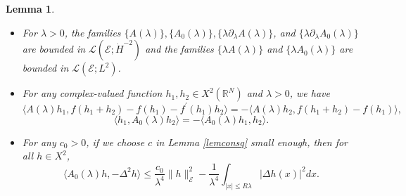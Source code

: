 \documentclass[a4paper,two-side,10pt]{amsart}
\newtheorem{lem}{Lemma}[section]
\newcommand{\R}{\mathbb{R}}
\numberwithin{equation}{section}
\begin{document}
\begin{lem}
\label{lemproperA}
\begin{itemize}
\item[(i)] For $\lambda>0$, the families $\{A(\lambda )\}, \{A_0 (\lambda) \}, \{\lambda \partial_\lambda A(\lambda)\}$, and $\{\lambda \partial_\lambda A_0 (\lambda)\}$ are bounded in $\mathcal{L} (\mathcal{E} ; \dot{H}^{-2})$ and the families $\{\lambda A(\lambda)\}$ and  $\{\lambda A_0 (\lambda)\}$ are bounded in $\mathcal{L} (\mathcal{E} ; L^2)$.
\item[(ii)] For any complex-valued function $h_1 ,h_2 \in X^2 (\R^N)$ and $\lambda>0$, we have
\begin{equation}
\label{properA1}
\langle A(\lambda)h_1 , f(h_1 +h_2) - f(h_1) - f^\prime (h_1) h_2\rangle = - \langle A(\lambda)h_2 , f(h_1 +h_2) - f(h_1) \rangle ,
\end{equation}
\begin{equation}
\label{properA2}
\langle h_1 ,A_0 (\lambda) h_2 \rangle =- \langle A_0 (\lambda ) h_1 ,h_2 \rangle .
\end{equation}
\item[(iii)] For any $c_0>0$, if we choose $c$ in Lemma \ref{lemconsq} small enough, then for all $h\in X^2$,
\begin{equation}
\label{properA3}
\langle A_0 (\lambda )h, -\Delta^2 h \rangle \leq \dfrac{c_0}{\lambda^4 } \|h\|^2_{\mathcal{E}} - \dfrac{1}{\lambda^4} \int_{|x|\leq R \lambda} |\Delta h(x)|^2 dx .
\end{equation}
\end{itemize}
\end{lem}
\end{document}
